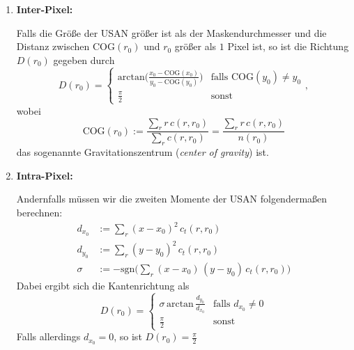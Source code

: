 \documentclass[a4paper, 11pt]{report}
\renewcommand{\emph}[1]{\textit{#1}}
\theoremstyle{definition}
\begin{document}
			\begin{enumerate}
				\item \textbf{Inter-Pixel:}

				\noindent Falls die Größe der USAN größer ist als der Maskendurchmesser und die Distanz zwischen $\text{COG}(r_0)$ und $r_0$ größer als $1$ Pixel ist, so ist die Richtung $D(r_0)$ gegeben durch
				$$ D(r_0) = \begin{cases}
					\text{arctan}\bigg(
						\frac{x_0 - \text{COG}(x_0)}
						{y_0 - \text{COG}(y_0)}
					\bigg) & \text{falls } \text{COG}(y_0) \neq y_0 \\
					
					\frac{\pi}{2} & \text{sonst}

				\end{cases}, $$
				wobei
				$$ \text{COG}(r_0) := \frac	{\sum_r r\,c(r,r_0)}	{\sum_r c(r,r_0)} = \frac	{\sum_r r\,c(r,r_0)} {n(r_0)}$$
				das sogenannte Gravitationszentrum (\emph{center of gravity}) ist.
				\item \textbf{Intra-Pixel:}
				
				\noindent Andernfalls müssen wir die zweiten Momente der USAN folgendermaßen berechnen:
				\begin{align*}
					d_{x_0} &:= \sum_r (x-x_0)^2 \, c_t(r,r_0) \\
					d_{y_0} &:= \sum_r (y-y_0)^2 \, c_t(r,r_0) \\
					\sigma 	&:= -\text{sgn}\bigg(\sum_r (x-x_0) \, (y-y_0) \, c_t(r,r_0)\bigg)
				\end{align*}
				Dabei ergibt sich die Kantenrichtung als
				$$ D(r_0) = \begin{cases}
						\sigma \, \text{arctan} \, \frac{d_{y_0}}{d_{x_0}} 	&	\text{falls } d_{x_0} \neq 0 \\ 
						\frac{\pi}{2}										&	\text{sonst}
					\end{cases}$$
				Falls allerdings $d_{x_0} = 0$, so ist $D(r_0) = \frac{\pi}{2}$
			\end{enumerate}
\end{document}
